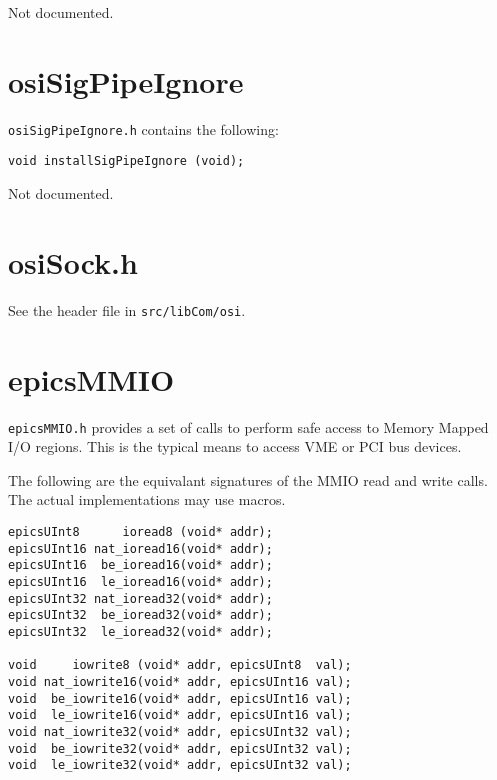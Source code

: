 Not documented.

\section{osiSigPipeIgnore}

\verb|osiSigPipeIgnore.h| contains the following:

\begin{verbatim}
void installSigPipeIgnore (void);
\end{verbatim}

Not documented.

\section{osiSock.h}

See the header file in \verb|src/libCom/osi|.

\section{epicsMMIO}

\verb|epicsMMIO.h| provides a set of calls to perform safe access to Memory Mapped I/O regions.
This is the typical means to access VME or PCI bus devices.

The following are the equivalant signatures of the MMIO read and write calls.
The actual implementations may use macros.

\begin{verbatim}
epicsUInt8      ioread8 (void* addr);
epicsUInt16 nat_ioread16(void* addr);
epicsUInt16  be_ioread16(void* addr);
epicsUInt16  le_ioread16(void* addr);
epicsUInt32 nat_ioread32(void* addr);
epicsUInt32  be_ioread32(void* addr);
epicsUInt32  le_ioread32(void* addr);

void     iowrite8 (void* addr, epicsUInt8  val);
void nat_iowrite16(void* addr, epicsUInt16 val);
void  be_iowrite16(void* addr, epicsUInt16 val);
void  le_iowrite16(void* addr, epicsUInt16 val);
void nat_iowrite32(void* addr, epicsUInt32 val);
void  be_iowrite32(void* addr, epicsUInt32 val);
void  le_iowrite32(void* addr, epicsUInt32 val);
\end{verbatim}

